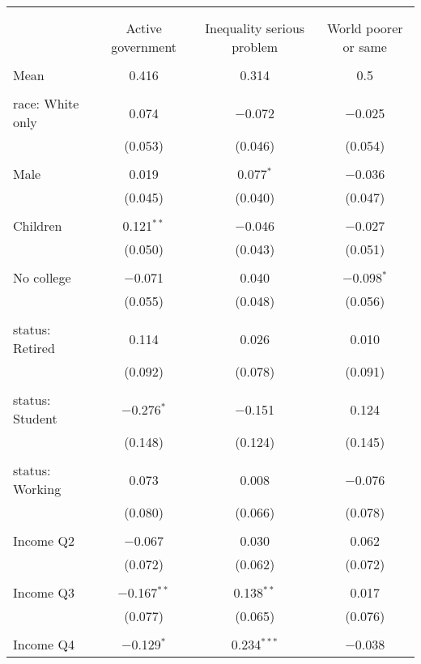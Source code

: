 
\begin{tabular}{@{\extracolsep{5pt}}lccc} 
\\[-1.8ex]\hline 
\hline \\[-1.8ex] 
\\[-1.8ex] & Active government & Inequality serious problem & World poorer or same \\ 
\hline \\[-1.8ex] 
 Mean & 0.416 & 0.314 & 0.5  \\ \hline \\[-1.8ex] race: White only & 0.074 & $-$0.072 & $-$0.025 \\ 
  & (0.053) & (0.046) & (0.054) \\ 
  & & & \\ 
 Male & 0.019 & 0.077$^{*}$ & $-$0.036 \\ 
  & (0.045) & (0.040) & (0.047) \\ 
  & & & \\ 
 Children & 0.121$^{**}$ & $-$0.046 & $-$0.027 \\ 
  & (0.050) & (0.043) & (0.051) \\ 
  & & & \\ 
 No college & $-$0.071 & 0.040 & $-$0.098$^{*}$ \\ 
  & (0.055) & (0.048) & (0.056) \\ 
  & & & \\ 
 status: Retired & 0.114 & 0.026 & 0.010 \\ 
  & (0.092) & (0.078) & (0.091) \\ 
  & & & \\ 
 status: Student & $-$0.276$^{*}$ & $-$0.151 & 0.124 \\ 
  & (0.148) & (0.124) & (0.145) \\ 
  & & & \\ 
 status: Working & 0.073 & 0.008 & $-$0.076 \\ 
  & (0.080) & (0.066) & (0.078) \\ 
  & & & \\ 
 Income Q2 & $-$0.067 & 0.030 & 0.062 \\ 
  & (0.072) & (0.062) & (0.072) \\ 
  & & & \\ 
 Income Q3 & $-$0.167$^{**}$ & 0.138$^{**}$ & 0.017 \\ 
  & (0.077) & (0.065) & (0.076) \\ 
  & & & \\ 
 Income Q4 & $-$0.129$^{*}$ & 0.234$^{***}$ & $-$0.038 \\ 

\end{tabular}

